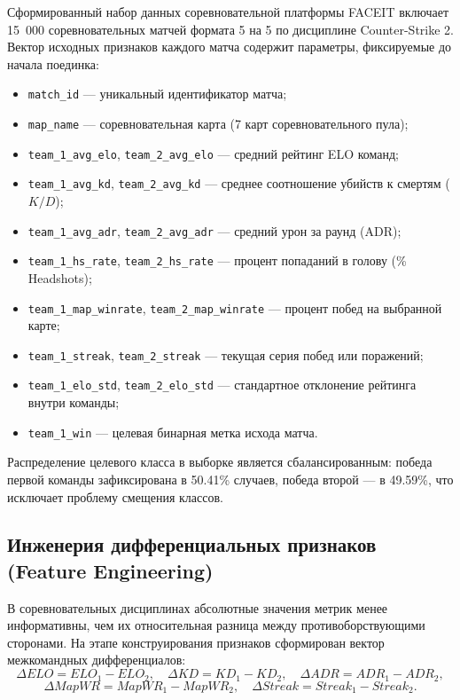 \documentclass[14pt, a4paper]{extarticle}
\begin{document}
Сформированный набор данных соревновательной платформы FACEIT включает 15~000 соревновательных матчей формата 5 на 5 по дисциплине Counter-Strike 2. Вектор исходных признаков каждого матча содержит параметры, фиксируемые до начала поединка:
\begin{itemize}
    \item \texttt{match\_id} --- уникальный идентификатор матча;
    \item \texttt{map\_name} --- соревновательная карта (7 карт соревновательного пула);
    \item \texttt{team\_1\_avg\_elo}, \texttt{team\_2\_avg\_elo} --- средний рейтинг ELO команд;
    \item \texttt{team\_1\_avg\_kd}, \texttt{team\_2\_avg\_kd} --- среднее соотношение убийств к смертям ($K/D$);
    \item \texttt{team\_1\_avg\_adr}, \texttt{team\_2\_avg\_adr} --- средний урон за раунд (ADR);
    \item \texttt{team\_1\_hs\_rate}, \texttt{team\_2\_hs\_rate} --- процент попаданий в голову (\% Headshots);
    \item \texttt{team\_1\_map\_winrate}, \texttt{team\_2\_map\_winrate} --- процент побед на выбранной карте;
    \item \texttt{team\_1\_streak}, \texttt{team\_2\_streak} --- текущая серия побед или поражений;
    \item \texttt{team\_1\_elo\_std}, \texttt{team\_2\_elo\_std} --- стандартное отклонение рейтинга внутри команды;
    \item \texttt{team\_1\_win} --- целевая бинарная метка исхода матча.
\end{itemize}

Распределение целевого класса в выборке является сбалансированным: победа первой команды зафиксирована в 50.41\% случаев, победа второй --- в 49.59\%, что исключает проблему смещения классов.

\subsection{Инженерия дифференциальных признаков (Feature Engineering)}

В соревновательных дисциплинах абсолютные значения метрик менее информативны, чем их относительная разница между противоборствующими сторонами. На этапе конструирования признаков сформирован вектор межкомандных дифференциалов:
\begin{equation}
\Delta ELO = ELO_1 - ELO_2, \quad \Delta KD = KD_1 - KD_2, \quad \Delta ADR = ADR_1 - ADR_2,
\end{equation}
\begin{equation}
\Delta MapWR = MapWR_1 - MapWR_2, \quad \Delta Streak = Streak_1 - Streak_2.
\end{equation}
\end{document}
